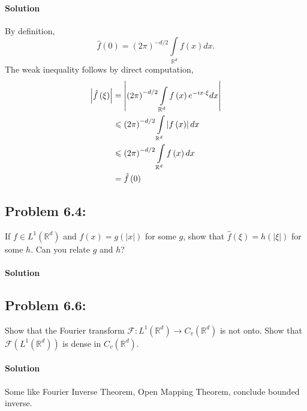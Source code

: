 \documentclass[letterpaper,twoside,11pt]{article}
\theoremstyle{mystyle}
\newcommand{\R}{{\mathbb R}}
\begin{document}
\paragraph*{Solution} By definition, 
\[\hat f\left( 0 \right) = {\left( {2\pi } \right)^{ - d/2}}\int\limits_{{\mathbb{R}^d}} {f\left( x \right)dx} .\]
The weak inequality follows by direct computation, 
\begin{align*}
  \left| {\hat f\left( \xi  \right)} \right| &= \left| {{{\left( {2\pi } \right)}^{ - d/2}}\int\limits_{{\mathbb{R}^d}} {f\left( x \right){e^{ - ix \cdot \xi }}dx} } \right| \hfill \\
   &\leqslant {\left( {2\pi } \right)^{ - d/2}}\int\limits_{{\mathbb{R}^d}} {\left| {f\left( x \right)} \right|dx}  \hfill \\
   &\leqslant {\left( {2\pi } \right)^{ - d/2}}\int\limits_{{\mathbb{R}^d}} {f\left( x \right)dx}  \hfill \\
   &= \hat f\left( 0 \right) 
  \end{align*}



\subsection*{Problem 6.4:}
If $f\in L^1\left( \R^d \right)$ and $f(x) = g\left( \left\vert x\right\vert  \right)$ for some $g$, show that $\hat f\left( \xi \right) = h\left( \left\vert \xi\right\vert \right) $ for some $h$. Can you relate $g$ and $h$? 

\paragraph*{Solution} 



\subsection*{Problem 6.6:}
Show that the Fourier transform $\mathcal F : L^1\left( \R^d \right)\to C_v\left( \R^d \right)$ is not onto. Show that $\mathcal F\left( L^1\left( \R^d \right) \right)$ is dense in $C_v\left( \R^d \right)$. 

\paragraph*{Solution} 
Some like Fourier Inverse Theorem, Open Mapping Theorem, conclude bounded inverse. 
\end{document}

